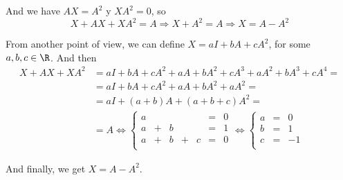 \documentclass[../../main.tex]{subfiles}
\begin{document}
  And we have $A X = A^2$ y $X A^2 = 0$, so
  $$
  X + A X + X A^2 = A \Longrightarrow X + A^2 = A \Longrightarrow X = A - A^2
  $$

  From another point of view, we can define $X = a I + b A + c A^2$, for some $a, b, c \in \R$. And then
  \begin{equation*}
    \begin{split}
      X + A X + X A^2 & =
      a I + b A + c A^2 + a A + b A^2 + c A^3 + a A^2 + b A^3 + c A^4 = \\ & =
      a I + b A + c A^2 + a A + b A^2 + a A^2 = \\ & =
      a I + (a + b) A + (a + b + c) A^2 = \\ & = A \iff
      \left \{
        \begin{matrix}
          a &   &   &   &   & = & 0 \\
          a & + & b &   &   & = & 1 \\
          a & + & b & + & c & = & 0 \\
        \end{matrix}
      \right . \iff \left \{
        \begin{matrix}
          a & = &  0 \\
          b & = &  1 \\
          c & = & -1 \\
        \end{matrix}
      \right .
    \end{split}
  \end{equation*}

  And finally, we get $X = A - A^2$.
\end{document}
